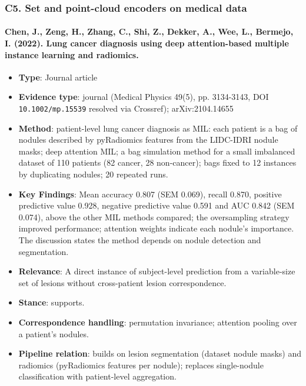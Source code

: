 \documentclass[journal,onecolumn]{IEEEtran}
\begin{document}
\subsubsection{C5. Set and point-cloud encoders on medical data}

\paragraph{Chen, J., Zeng, H., Zhang, C., Shi, Z., Dekker, A., Wee, L., Bermejo, I. (2022). Lung cancer diagnosis using deep attention-based multiple instance learning and radiomics.~\cite{Chen2022LungMIL}}\mbox{}

\begin{itemize}

\item{} \textbf{Type}: Journal article

\item{} \textbf{Evidence type}: journal (Medical Physics 49(5), pp. 3134-3143, DOI \nolinkurl{10.1002/mp.15539} resolved via Crossref); arXiv:2104.14655

\item{} \textbf{Method}: patient-level lung cancer diagnosis as MIL: each patient is a bag of nodules described by pyRadiomics features from the LIDC-IDRI nodule masks; deep attention MIL; a bag simulation method for a small imbalanced dataset of 110 patients (82 cancer, 28 non-cancer); bags fixed to 12 instances by duplicating nodules; 20 repeated runs.

\item{} \textbf{Key Findings}: Mean accuracy 0.807 (SEM 0.069), recall 0.870, positive predictive value 0.928, negative predictive value 0.591 and AUC 0.842 (SEM 0.074), above the other MIL methods compared; the oversampling strategy improved performance; attention weights indicate each nodule's importance. The discussion states the method depends on nodule detection and segmentation.

\item{} \textbf{Relevance}: A direct instance of subject-level prediction from a variable-size set of lesions without cross-patient lesion correspondence.

\item{} \textbf{Stance}: supports.

\item{} \textbf{Correspondence handling}: permutation invariance; attention pooling over a patient's nodules.

\item{} \textbf{Pipeline relation}: builds on lesion segmentation (dataset nodule masks) and radiomics (pyRadiomics features per nodule); replaces single-nodule classification with patient-level aggregation.


\end{itemize}
\end{document}
